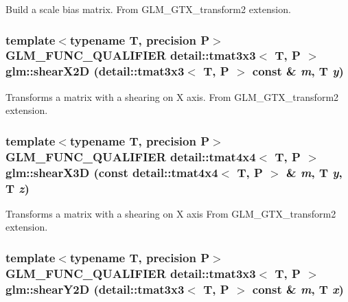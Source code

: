 Build a scale bias matrix. From GLM\_\-GTX\_\-transform2 extension. \hypertarget{group__gtx__transform2_gb571921ddab480d5cd402b5f3e325fb7}{
\subsubsection[shearX2D]{\setlength{\rightskip}{0pt plus 5cm}template$<$typename T, precision P$>$ GLM\_\-FUNC\_\-QUALIFIER detail::tmat3x3$<$ T, P $>$ glm::shearX2D (detail::tmat3x3$<$ T, P $>$ const \& {\em m}, \/  T {\em y})}}
\label{group__gtx__transform2_gb571921ddab480d5cd402b5f3e325fb7}


Transforms a matrix with a shearing on X axis. From GLM\_\-GTX\_\-transform2 extension. \hypertarget{group__gtx__transform2_ga091ba9f8bd59949adaf8ed5d4ec52ed}{
\subsubsection[shearX3D]{\setlength{\rightskip}{0pt plus 5cm}template$<$typename T, precision P$>$ GLM\_\-FUNC\_\-QUALIFIER detail::tmat4x4$<$ T, P $>$ glm::shearX3D (const detail::tmat4x4$<$ T, P $>$ \& {\em m}, \/  T {\em y}, \/  T {\em z})}}
\label{group__gtx__transform2_ga091ba9f8bd59949adaf8ed5d4ec52ed}


Transforms a matrix with a shearing on X axis From GLM\_\-GTX\_\-transform2 extension. \hypertarget{group__gtx__transform2_g17fa300cd87fdaadb7b40970d1efc515}{
\subsubsection[shearY2D]{\setlength{\rightskip}{0pt plus 5cm}template$<$typename T, precision P$>$ GLM\_\-FUNC\_\-QUALIFIER detail::tmat3x3$<$ T, P $>$ glm::shearY2D (detail::tmat3x3$<$ T, P $>$ const \& {\em m}, \/  T {\em x})}}
\label{group__gtx__transform2_g17fa300cd87fdaadb7b40970d1efc515}


